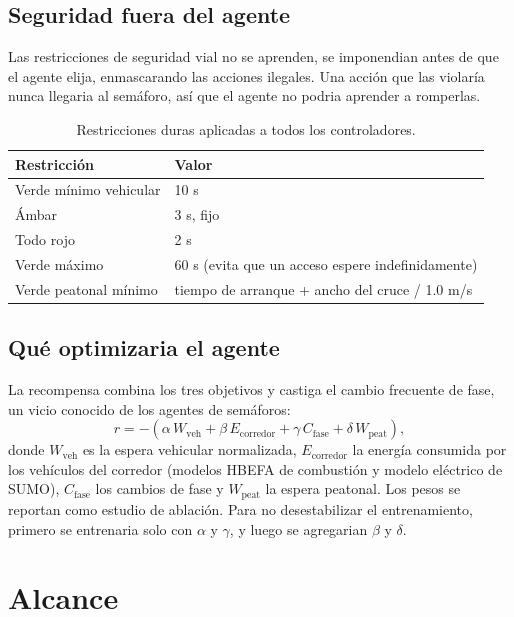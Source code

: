 \documentclass[11pt,letterpaper]{article}
\begin{document}
\subsection{Seguridad fuera del agente}

Las restricciones de seguridad vial no se aprenden, se imponendian antes de que el
agente elija, enmascarando las acciones ilegales. Una acción que las violaría
nunca llegaria al semáforo, así que el agente no podria aprender a romperlas.

\begin{table}[!htbp]
\centering\small
\caption{Restricciones duras aplicadas a todos los controladores.}
\begin{tabular}{ll}
\toprule
Restricción & Valor\\
\midrule
Verde mínimo vehicular & 10 s\\
Ámbar & 3 s, fijo\\
Todo rojo & 2 s\\
Verde máximo & 60 s (evita que un acceso espere indefinidamente)\\
Verde peatonal mínimo & tiempo de arranque + ancho del cruce / 1.0 m/s\\
\bottomrule
\end{tabular}
\end{table}

\subsection{Qué optimizaria el agente}

La recompensa combina los tres objetivos y castiga el cambio frecuente de fase,
un vicio conocido de los agentes de semáforos:
\begin{equation}
  r = -\left(\alpha\, W_{\text{veh}} + \beta\, E_{\text{corredor}} + \gamma\, C_{\text{fase}} + \delta\, W_{\text{peat}}\right),
\end{equation}
donde $W_{\text{veh}}$ es la espera vehicular normalizada, $E_{\text{corredor}}$
la energía consumida por los vehículos del corredor (modelos HBEFA de combustión y
modelo eléctrico de SUMO), $C_{\text{fase}}$ los cambios de fase y
$W_{\text{peat}}$ la espera peatonal. Los pesos se reportan como estudio de
ablación. Para no desestabilizar el entrenamiento, primero se entrenaria solo con
$\alpha$ y $\gamma$, y luego se agregarian $\beta$ y $\delta$.




\section{Alcance}
\end{document}
